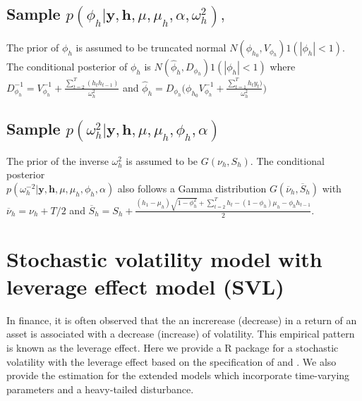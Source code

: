 \documentclass[11pt]{article}
\numberwithin{equation}{section}
\begin{document}
\subsection*{ Sample $p(\phi_h|\mathbf{y}, \mathbf{h}, \mu, \mu_h, \alpha, \omega^2_h),$}
The prior of $\phi_h$ is assumed to be truncated normal $N(\phi_{h_0}, V_{\phi_h})1(|\phi_h|<1)$. The conditional posterior of $\phi_h$ is $N(\hat{\phi}_{h}, D_{\phi_h})1(|\phi_h|<1)$ where $ D^{-1}_{\phi_h} =V^{-1}_{\phi_h} + \frac{\sum_{t=2}^T(h_{t}h_{t-1})}{\omega_h^2}$ and $\hat{\phi}_{h}=D_{\phi_h} \Big (\phi_{h_0}V^{-1}_{\phi_h}+ \frac{\sum_{t=1}^Th_ty_t)}{\omega^2_h} \Big)$
\subsection*{Sample $p(\omega^2_h|\mathbf{y}, \mathbf{h}, \mu, \mu_h, \phi_h, \alpha)$}
The prior of the inverse $\omega^2_h$ is assumed to be $G(\nu_h, S_h)$. The conditional posterior\\
 $p(\omega^{-2}_h|\mathbf{y}, \mathbf{h}, \mu, \mu_h, \phi_h, \alpha)$ also follows a Gamma distribution $G(\overline{\nu}_h, \overline{S}_h)$ with $\overline{\nu}_h=\nu_h+T/2$ and $\overline{S}_h= S_h+ \frac{(h_1-\mu_h)\sqrt{1-\phi_h^2} +\sum_{t=2}^T h_t -(1-\phi_h)\mu_h - \phi_h h_{t-1}}{2}$.
\section{Stochastic volatility model with leverage effect model (SVL)}
In finance, it is often observed that the an increrease (decrease) in a return of an asset is associated with a decrease (increase) of volatility. This empirical pattern is known as the leverage effect. Here we provide a R package for a stochastic volatility with the leverage effect based on the specification of \cite{Yu2005} and \cite{Omori2007}. We also provide the estimation for the extended models which incorporate time-varying parameters and a heavy-tailed disturbance.\\
\end{document}

